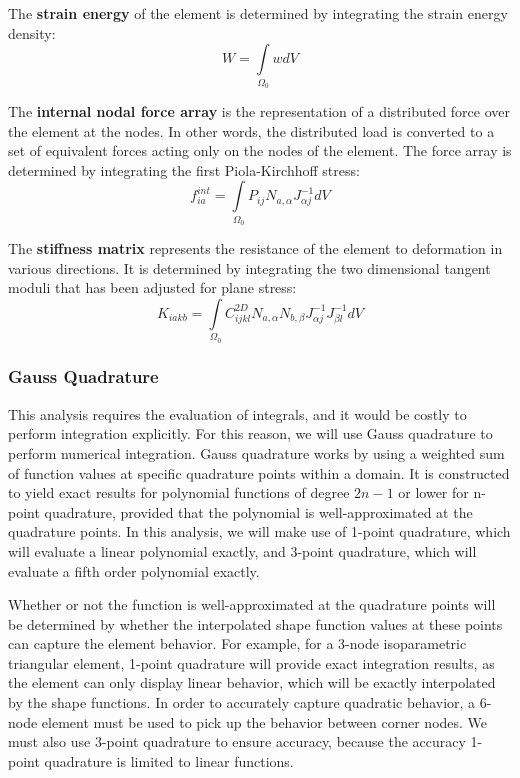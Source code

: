 \documentclass[]{spie}  %
\begin{document}
The \textbf{strain energy} of the element is determined by integrating the strain energy density:
\begin{equation}
\label{eq: strain energy}
W = \int\limits_{\Omega_0} w dV
\end{equation}

The \textbf{internal nodal force array} is the representation of a distributed force over the element at the nodes. In other words, the distributed load is converted to a set of equivalent forces acting only on the nodes of the element. The force array is determined by integrating the first Piola-Kirchhoff stress:
\begin{equation}
\label{eq: internal nodal force array}
f_{ia}^{int} = \int\limits_{\Omega_0} P_{ij} N_{a,\alpha} J_{\alpha j}^{-1} dV
\end{equation}

The \textbf{stiffness matrix} represents the resistance of the element to deformation in various directions. It is determined by integrating the two dimensional tangent moduli that has been adjusted for plane stress:
\begin{equation}
\label{eq: stiffness matrix}
K_{iakb} = \int\limits_{\Omega_0} C_{ijkl}^{2D} N_{a,\alpha} N_{b,\beta} J_{\alpha j}^{-1} J_{\beta l}^{-1} dV
\end{equation}

\subsubsection{Gauss Quadrature}
This analysis requires the evaluation of integrals, and it would be costly to perform integration explicitly. For this reason, we will use Gauss quadrature to perform numerical integration. Gauss quadrature works by using a weighted sum of function values at specific quadrature points within a domain. It is constructed to yield exact results for polynomial functions of degree $2n-1$ or lower for n-point quadrature, provided that the polynomial is well-approximated at the quadrature points. In this analysis, we will make use of 1-point quadrature, which will evaluate a linear polynomial exactly, and 3-point quadrature, which will evaluate a fifth order polynomial exactly. 

Whether or not the function is well-approximated at the quadrature points will be determined by whether the interpolated shape function values at these points can capture the element behavior. For example, for a 3-node isoparametric triangular element, 1-point quadrature will provide exact integration results, as the element can only display linear behavior, which will be exactly interpolated by the shape functions. In order to accurately capture quadratic behavior, a 6-node element must be used to pick up the behavior between corner nodes. We must also use 3-point quadrature to ensure accuracy, because the accuracy 1-point quadrature is limited to linear functions.
\end{document}
